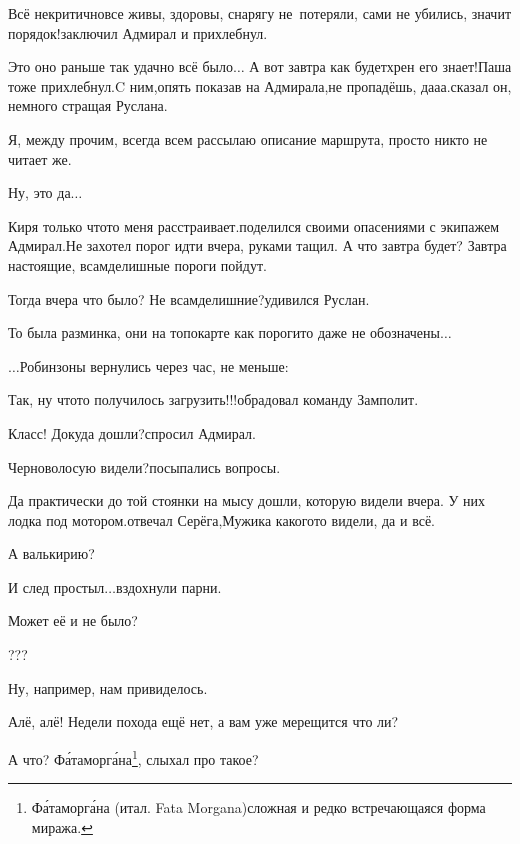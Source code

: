 \diagdash Всё некритично\mdash все живы, здоровы, снарягу не~потеряли, сами не убились, значит порядок!\mdash заключил Адмирал и прихлебнул.

\diagdash Это оно раньше так удачно всё было$\ldots$ А вот завтра как будет\mdash хрен его знает!\mdash Паша тоже прихлебнул.\mdash C ним,\mdash опять показав на Адмирала,\mdash не пропадёшь, да\sdash а\sdash а.\mdash сказал он, немного стращая Руслана.

\diagdash Я, между прочим, всегда всем рассылаю описание маршрута, просто никто не читает же.

\diagdash Ну, это да$\ldots$

\diagdash Киря только что\sdash то меня расстраивает.\mdash поделился своими опасениями с экипажем Адмирал.\mdash Не захотел порог идти вчера, руками тащил. А что завтра будет? Завтра настоящие, всамделишные пороги пойдут.

\diagdash Тогда вчера что было? Не всамделишние?\mdash удивился Руслан.

\diagdash То была разминка, они на топокарте как пороги\sdash то даже не обозначены$\ldots$

\vspace{0.5cm}
$\ldots$Робинзоны вернулись через час, не меньше:

\diagdash Так, ну что\sdash то получилось загрузить!!!\mdash обрадовал команду Замполит.

\diagdash Класс! Докуда дошли?\mdash спросил Адмирал.

\diagdash Черноволосую видели?\mdash посыпались вопросы.

\diagdash Да практически до той стоянки на мысу дошли, которую видели вчера. У них лодка под мотором.\mdash отвечал Серёга,\mdash Мужика какого\sdash то видели, да и всё.

\diagdash А валькирию?

\diagdash И след простыл$\ldots$\mdash вздохнули парни.

\diagdash Может её и не было?

\diagdash ???

\diagdash Ну, например, нам привиделось.

\diagdash Алё, алё! Недели похода ещё нет, а вам уже мерещится что ли?

\renewcommand*{\thefootnote}{\fnsymbol{footnote}}
\setcounter{footnote}{0}

\diagdash А что? Ф\'ата\sdash морг\'ана\footnote{Ф\'ата\sdash морг\'ана (итал. Fata Morgana)\mdash сложная и редко встречающаяся форма миража.}, слыхал про такое?

